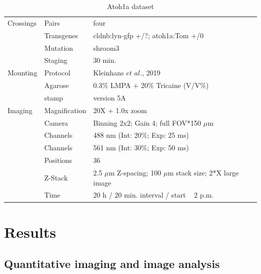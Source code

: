 \documentclass[10pt, b5paper, singlespacinge, twoside]{reedthesis} %
\theoremstyle{definition}
\theoremstyle{definition}
\theoremstyle{definition}
\theoremstyle{remark}
\begin{document}
\begin{table}[!h]

\caption{\label{tab:imgdatato}Atoh1a dataset}
\centering
\begin{tabu} to 
\toprule
Crossings & Pairs & four\\
 & Transgenes & cldnb:lyn-gfp +/?; atoh1a:Tom +/0\\
 & Mutation & shroom3\\
 & Staging & 30 min.\\
Mounting & Protocol & Kleinhans $\textit{et al.}$, 2019\\
\addlinespace
 & Agarose & 0.3$\%$ LMPA + 20$\%$ Tricaine (V/V$\%$)\\
 & stamp & version 5A\\
Imaging & Magnification & 20X + 1.0x zoom\\
 & Camera & Binning 2x2; Gain 4; full FOV*150 $\mu$m\\
 & Channels & 488 nm (Int: 20$\%$; Exp: 25 ms)\\
\addlinespace
 & Channels & 561 nm (Int: 30$\%$; Exp: 50 ms)\\
 & Positions & 36\\
 & Z-Stack & 2.5 $\mu$m Z-spacing; 100 $\mu$m stack size; 2*X large image\\
 & Time & 20 h / 20 min. interval / start ~ 2 p.m.\\
\bottomrule
\end{tabu}
\end{table}
\hypertarget{res}{%
\chapter{Results}\label{res}}

\hypertarget{res-met}{%
\section{Quantitative imaging and image analysis}\label{res-met}}
\end{document}
